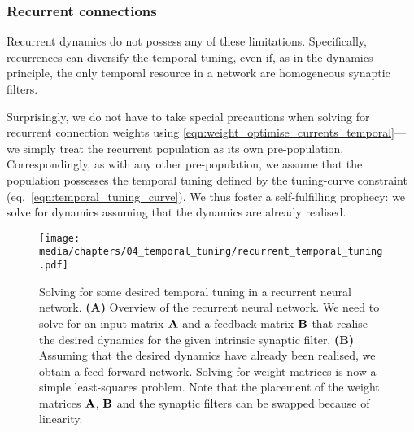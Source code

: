 \subsubsection{Recurrent connections}

Recurrent dynamics do not possess any of these limitations.
Specifically, recurrences can diversify the temporal tuning, even if, as in the \NEF dynamics principle, the only temporal resource in a network are homogeneous synaptic filters.

Surprisingly, we do not have to take special precautions when solving for recurrent connection weights using \cref{eqn:weight_optimise_currents_temporal}---we simply treat the recurrent population as its own pre-population.
Correspondingly, as with any other pre-population, we assume that the population possesses the temporal tuning defined by the tuning-curve constraint (eq.~\ref{eqn:temporal_tuning_curve}).
We thus foster a self-fulfilling prophecy: we solve for dynamics assuming that the dynamics are already realised.


\begin{figure}
	\centering
	\texttt{[image: media/chapters/04\_temporal\_tuning/recurrent\_temporal\_tuning.pdf]}
	\caption[Solving for some desired temporal tuning in a recurrent neural network]{Solving for some desired temporal tuning in a recurrent neural network. \textbf{(A)} Overview of the recurrent neural network. We need to solve for an input matrix $\mathbf{A}$ and a feedback matrix $\mathbf{B}$ that realise the desired dynamics for the given intrinsic synaptic filter.
	\textbf{(B)} Assuming that the desired dynamics have already been realised, we obtain a feed-forward network.
	Solving for weight matrices is now a simple least-squares problem.
	Note that the placement of the weight matrices $\mathbf{A}$, $\mathbf{B}$ and the synaptic filters can be swapped because of linearity.
	}
	\label{fig:recurrent_temporal_tuning}
\end{figure}

